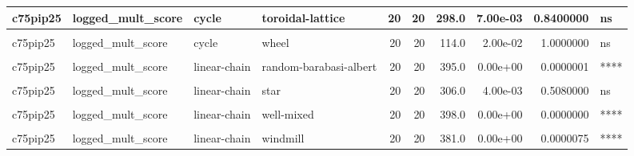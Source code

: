 \documentclass[
]{book}
\begin{document}
\begin{table}
\begin{tabular}{l|l|l|l|r|r|r|r|r|l}
\hline
c75pip25 & logged\_mult\_score & cycle & toroidal-lattice & 20 & 20 & 298.0 & 7.00e-03 & 0.8400000 & ns\\
\hline
\cellcolor{gray!6}{c75pip25} & \cellcolor{gray!6}{logged\_mult\_score} & \cellcolor{gray!6}{cycle} & \cellcolor{gray!6}{well-mixed} & \cellcolor{gray!6}{20} & \cellcolor{gray!6}{20} & \cellcolor{gray!6}{400.0} & \cellcolor{gray!6}{0.00e+00} & \cellcolor{gray!6}{0.0000000} & \cellcolor{gray!6}{****}\\
\hline
c75pip25 & logged\_mult\_score & cycle & wheel & 20 & 20 & 114.0 & 2.00e-02 & 1.0000000 & ns\\
\hline
\cellcolor{gray!6}{c75pip25} & \cellcolor{gray!6}{logged\_mult\_score} & \cellcolor{gray!6}{cycle} & \cellcolor{gray!6}{windmill} & \cellcolor{gray!6}{20} & \cellcolor{gray!6}{20} & \cellcolor{gray!6}{398.0} & \cellcolor{gray!6}{0.00e+00} & \cellcolor{gray!6}{0.0000000} & \cellcolor{gray!6}{****}\\
\hline
c75pip25 & logged\_mult\_score & linear-chain & random-barabasi-albert & 20 & 20 & 395.0 & 0.00e+00 & 0.0000001 & ****\\
\hline
\cellcolor{gray!6}{c75pip25} & \cellcolor{gray!6}{logged\_mult\_score} & \cellcolor{gray!6}{linear-chain} & \cellcolor{gray!6}{random-waxman} & \cellcolor{gray!6}{20} & \cellcolor{gray!6}{20} & \cellcolor{gray!6}{345.0} & \cellcolor{gray!6}{3.36e-05} & \cellcolor{gray!6}{0.0055104} & \cellcolor{gray!6}{**}\\
\hline
c75pip25 & logged\_mult\_score & linear-chain & star & 20 & 20 & 306.0 & 4.00e-03 & 0.5080000 & ns\\
\hline
\cellcolor{gray!6}{c75pip25} & \cellcolor{gray!6}{logged\_mult\_score} & \cellcolor{gray!6}{linear-chain} & \cellcolor{gray!6}{toroidal-lattice} & \cellcolor{gray!6}{20} & \cellcolor{gray!6}{20} & \cellcolor{gray!6}{300.0} & \cellcolor{gray!6}{6.00e-03} & \cellcolor{gray!6}{0.7380000} & \cellcolor{gray!6}{ns}\\
\hline
c75pip25 & logged\_mult\_score & linear-chain & well-mixed & 20 & 20 & 398.0 & 0.00e+00 & 0.0000000 & ****\\
\hline
\cellcolor{gray!6}{c75pip25} & \cellcolor{gray!6}{logged\_mult\_score} & \cellcolor{gray!6}{linear-chain} & \cellcolor{gray!6}{wheel} & \cellcolor{gray!6}{20} & \cellcolor{gray!6}{20} & \cellcolor{gray!6}{122.0} & \cellcolor{gray!6}{3.50e-02} & \cellcolor{gray!6}{1.0000000} & \cellcolor{gray!6}{ns}\\
\hline
c75pip25 & logged\_mult\_score & linear-chain & windmill & 20 & 20 & 381.0 & 0.00e+00 & 0.0000075 & ****\\

\end{tabular}
\end{table}
\end{document}
